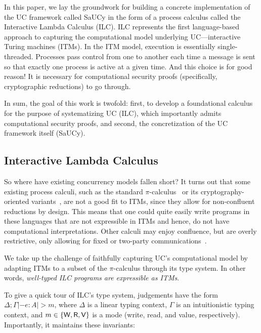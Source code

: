In this paper, we lay the groundwork for building a concrete implementation of
the UC framework called SaUCy in the form of a process calculus called the
Interactive Lambda Calculus (ILC). ILC represents the first language-based
approach to capturing the computational model underlying UC---interactive Turing
machines (ITMs). In the ITM model, execution is essentially
single-threaded. Processes pass control from one to another each time a message
is sent so that exactly one process is active at a given time. And this choice
is for good reason! It is necessary for computational security proofs
(specifically, cryptographic reductions) to go through.

In sum, the goal of this work is twofold: first, to develop a foundational
calculus for the purpose of systematizing UC (ILC), which importantly admits
computational security proofs, and second, the concretization of the UC
framework itself (SaUCy).

\subsection{Interactive Lambda Calculus}

So where have existing concurrency models fallen short?  It turns out that some
existing process calculi, such as the standard
$\pi$-calculus~\cite{milner1999communicating} or its cryptography-oriented
variants~\cite{abadi1999calculus, abadi2001mobile}, are not a good fit to ITMs,
since they allow for non-confluent reductions by design. This means that one
could quite easily write programs in these languages that are not expressible in
ITMs and hence, do not have computational interpretations. Other calculi may
enjoy confluence, but are overly restrictive, only allowing for fixed or
two-party
communications~\cite{kobayashi1999linearity,bohl2016symbolic,fowler2018session}. 

We take up the challenge of faithfully capturing UC's computational model by
adapting ITMs to a subset of the $\pi$-calculus through its type system. In other
words, \emph{well-typed ILC programs are expressible as ITMs}.

To give a quick tour of ILC's type system, judgements have the form $\Delta ; \Gamma |- e
: A |> m$, where $\Delta$ is a linear typing context, $\Gamma$ is an intuitionistic typing
context, and $m \in \{\textsf{W}, \textsf{R}, \textsf{V}\}$ is a mode (write, read, and value,
respectively). Importantly, it maintains these invariants:


